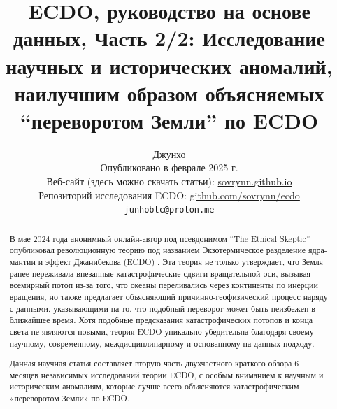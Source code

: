 \documentclass[10pt,twocolumn,letterpaper]{article}
\begin{document}
\title{ECDO, руководство на основе данных, Часть 2/2: Исследование научных и исторических аномалий, наилучшим образом объясняемых “переворотом Земли” по ECDO}

\author{Джунхо\\
Опубликовано в феврале 2025 г.\\
Веб-сайт (здесь можно скачать статьи): \href{https://sovrynn.github.io}{sovrynn.github.io}\\
Репозиторий исследования ECDO: \href{https://github.com/sovrynn/ecdo}{github.com/sovrynn/ecdo}\\
{\tt\small junhobtc@proton.me}
}

\maketitle

\begin{abstract}
В мае 2024 года анонимный онлайн-автор под псевдонимом “The Ethical Skeptic” \cite{0} опубликовал революционную теорию под названием Экзотермическое разделение ядра-мантии и эффект Джанибекова (ECDO) \cite{1}. Эта теория не только утверждает, что Земля ранее переживала внезапные катастрофические сдвиги вращательной оси, вызывая всемирный потоп из-за того, что океаны переливались через континенты по инерции вращения, но также предлагает объясняющий причинно-геофизический процесс наряду с данными, указывающими на то, что подобный переворот может быть неизбежен в ближайшее время. Хотя подобные предсказания катастрофических потопов и конца света не являются новыми, теория ECDO уникально убедительна благодаря своему научному, современному, междисциплинарному и основанному на данных подходу.

Данная научная статья составляет вторую часть двухчастного краткого обзора 6 месяцев независимых исследований \cite{2,20} теории ECDO, с особым вниманием к научным и историческим аномалиям, которые лучше всего объясняются катастрофическим «переворотом Земли» по ECDO.

\end{abstract}
\end{document}
